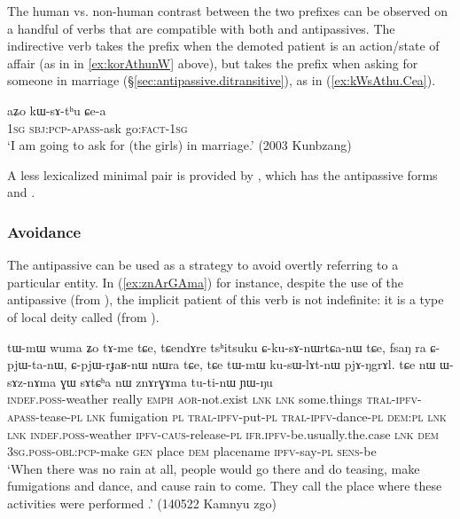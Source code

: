The human vs. non-human contrast between the two prefixes can be observed on a handful of verbs that are compatible with both  and  antipassives. The indirective verb  takes the  prefix when the demoted patient is an action/state of affair (as in  in \ref{ex:korAthunW} above), but takes the  prefix when asking for someone in marriage (§\ref{sec:antipassive.ditransitive}), as in (\ref{ex:kWsAthu.Cea}).
 
\begin{exe}
\ex \label{ex:kWsAthu.Cea}
\gll  aʑo kɯ-sɤ-tʰu ɕe-a \\
\textsc{1sg} \textsc{sbj}:\textsc{pcp}-\textsc{apass}-ask go:\textsc{fact}-\textsc{1sg} \\
\glt `I am going to ask for (the girls) in marriage.' (2003 Kunbzang)
\end{exe}

A less lexicalized minimal pair is provided by , which has the antipassive forms  and .

\subsubsection{Avoidance} \label{sec:antipassive.avoidance}
The  antipassive can be used as a strategy to avoid overtly referring to a particular entity. In (\ref{ex:znArGAma}) for instance, despite the use of the antipassive  (from ), the implicit patient of this verb is not indefinite: it is a type of local deity called   (from ).

\begin{exe}
\ex \label{ex:znArGAma}
\gll tɯ-mɯ wuma ʑo tɤ-me tɕe, tɕendɤre tsʰitsuku ɕ-ku-sɤ-nɯrtɕa-nɯ tɕe, fsaŋ ra ɕ-pjɯ-ta-nɯ, ɕ-pjɯ-rɟaʁ-nɯ nɯra tɕe, tɕe tɯ-mɯ ku-sɯ-lɤt-nɯ pjɤ-ŋgrɤl. tɕe nɯ ɯ-sɤz-nɤma ɣɯ sɤtɕʰa nɯ znɤrɣɤma tu-ti-nɯ ɲɯ-ŋu \\
\textsc{indef}.\textsc{poss}-weather really \textsc{emph} \textsc{aor}-not.exist \textsc{lnk} \textsc{lnk} some.things \textsc{tral}-\textsc{ipfv}-\textsc{apass}-tease-\textsc{pl} \textsc{lnk} fumigation \textsc{pl} \textsc{tral}-\textsc{ipfv}-put-\textsc{pl} \textsc{tral}-\textsc{ipfv}-dance-\textsc{pl} \textsc{dem}:\textsc{pl} \textsc{lnk} \textsc{lnk} \textsc{indef}.\textsc{poss}-weather \textsc{ipfv}-\textsc{caus}-release-\textsc{pl} \textsc{ifr}.\textsc{ipfv}-be.usually.the.case \textsc{lnk} \textsc{dem} \textsc{3sg}.\textsc{poss}-\textsc{obl}:\textsc{pcp}-make \textsc{gen} place \textsc{dem} placename \textsc{ipfv}-say-\textsc{pl} \textsc{sens}-be \\
\glt `When there was no rain at all, people would go there and do teasing, make fumigations and dance, and cause rain to come. They call the place where these activities were performed .' (140522 Kamnyu zgo) 	
\end{exe}

